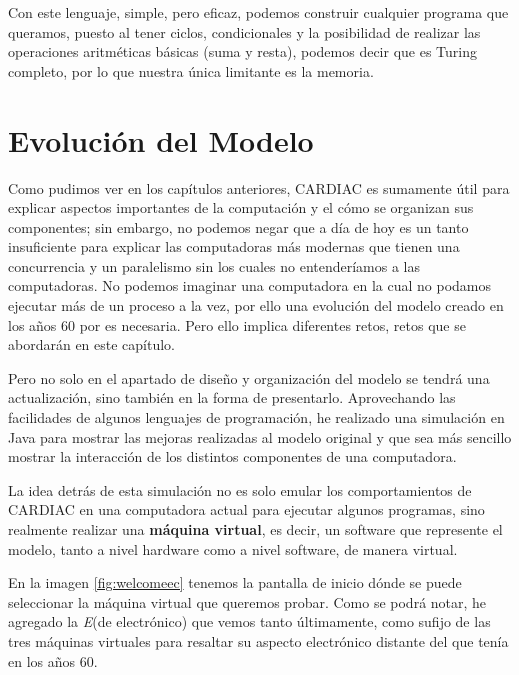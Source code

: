 \documentclass[letterpaper,12pt,oneside]{book}
\begin{document}
	Con este lenguaje, simple, pero eficaz, podemos construir cualquier programa que queramos,
	puesto al tener ciclos, condicionales y la posibilidad de realizar
	las operaciones aritméticas básicas (suma y resta), podemos
	decir que es Turing completo, por lo que nuestra única limitante es la memoria.
	
	
	

	\clearpage	
	
\chapter{Evolución del Modelo}  %

	Como pudimos ver en los capítulos anteriores, CARDIAC es sumamente útil para explicar aspectos importantes de la computación y el cómo se organizan sus 	
	componentes; sin embargo, no podemos negar que a día de hoy es un tanto insuficiente para explicar las computadoras más modernas que tienen
	una concurrencia y un paralelismo sin los cuales no entenderíamos a las computadoras. No podemos imaginar una computadora en la cual no podamos 	
	ejecutar más de un proceso a la vez, por ello una evolución del modelo creado en los años 60 por \cite{fingerman_instruction_1968} es
	necesaria. Pero ello implica diferentes retos, retos que se abordarán en este capítulo.
	
	Pero no solo en el apartado de diseño y organización del modelo se tendrá una actualización, sino también en la forma de presentarlo. Aprovechando
	las facilidades de algunos lenguajes de programación, he realizado una simulación en Java para mostrar las mejoras realizadas al modelo
	original y que sea más sencillo mostrar la interacción de los distintos componentes de una computadora.
 
    La idea detrás de esta simulación
	no es solo emular los comportamientos de CARDIAC en una computadora actual para ejecutar algunos programas,
	sino realmente realizar una \textbf{máquina virtual}, es decir, un software que represente
	el modelo, tanto a nivel hardware como a nivel software, de manera virtual.
 
    En la imagen \ref{fig:welcomeec} tenemos la pantalla de inicio
	dónde se puede seleccionar la máquina virtual que queremos probar. Como se podrá notar, he agregado la \textit{E}(de electrónico) que vemos tanto últimamente, como sufijo de las tres máquinas virtuales para resaltar su aspecto
	electrónico distante del que tenía en los años 60. 
\end{document}
